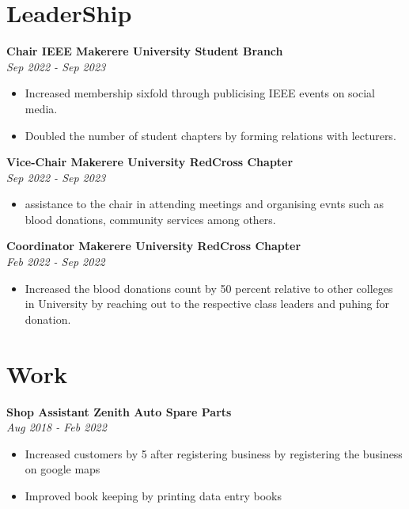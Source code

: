 \documentclass[a4paper,twocolumn]{article}
\begin{document}
    
    
        \section*{\bf LeaderShip}
        {\bf Chair IEEE Makerere University Student Branch}\\
        \hfil{\em Sep 2022 - Sep 2023}
        \begin{itemize}
            \itemsep0em
            \item Increased membership sixfold through publicising IEEE events on social media.
            \item Doubled the number of student chapters by forming relations with lecturers.
        \end{itemize}


        {\bf Vice-Chair Makerere University RedCross Chapter}\\
        \hfil{\em Sep 2022 - Sep 2023}
        \begin{itemize}
            \itemsep0em
            \item assistance to the chair in attending meetings and organising evnts such as blood donations, community services among others.
        \end{itemize}

        {\bf Coordinator Makerere University RedCross Chapter}\\
        \hfil{\em Feb 2022 - Sep 2022}
        \begin{itemize}
            \itemsep0em
            \item Increased the blood donations count by 50 percent relative to other colleges in University by reaching out to the respective class leaders and puhing for donation.
        \end{itemize}
    
    
    

        \section*{\bf Work}
        {\bf Shop Assistant Zenith Auto Spare Parts}\\
        \hfil{\em Aug 2018 - Feb 2022}
        \begin{itemize}
            \itemsep0em
            \item Increased customers by 5 after registering business by registering the business on google maps
            \item Improved book keeping by printing data entry books
        \end{itemize}
    
\end{document}
